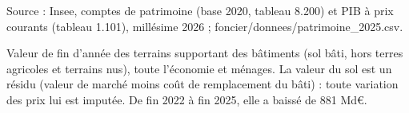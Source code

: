Source : Insee, comptes de patrimoine (base 2020, tableau 8.200) et PIB à prix courants (tableau 1.101), millésime 2026 ; foncier/donnees/patrimoine\_2025.csv.\par Valeur de fin d'année des terrains supportant des bâtiments (sol bâti, hors terres agricoles et terrains nus), toute l'économie et ménages. La valeur du sol est un résidu (valeur de marché moins coût de remplacement du bâti) : toute variation des prix lui est imputée. De fin 2022 à fin 2025, elle a baissé de 881 Md€.

